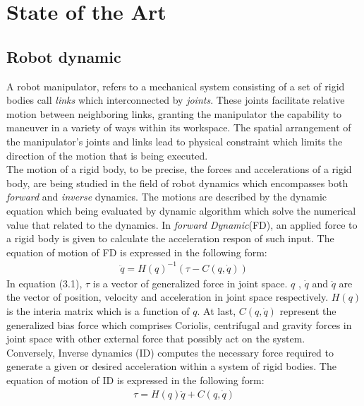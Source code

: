\documentclass[report.tex]{subfiles}
\begin{document}
    \chapter{State of the Art}
    \section{Robot dynamic}
    \noindent A robot manipulator, refers to a mechanical system consisting of a set of rigid bodies call \textit{links} which interconnected by \textit{joints}. These joints facilitate relative motion between neighboring links, granting the manipulator the capability to maneuver in a variety of ways within its workspace. The spatial arrangement of the manipulator's joints and links lead to physical constraint which limits the direction of the motion that is being executed.\\
    The motion of a rigid body, to be precise, the forces and accelerations of a rigid body, are being studied in the field of robot dynamics which encompasses both \textit{forward} and \textit{inverse} dynamics. The motions are described by the dynamic equation which being evaluated by dynamic algorithm which solve the numerical value that related to the dynamics\cite{featherstone2007book}.
    In \textit{forward Dynamic}(FD), an applied force to a rigid body is given to calculate the acceleration respon of such input\cite{featherstone2007book}. The equation of motion of FD is expressed in the following form:
    \begin{align}
            \ddot{q} = H(q)^{-1}(\tau - C(q,\dot{q}))
    \end{align}
    In equation (3.1), $\tau$ is a vector of generalized force in joint space. $q$ , $\dot{q}$ and $\ddot{q}$ are the vector of position, velocity and acceleration in joint space respectively. $H(q)$ is the interia matrix which is a function of $q$. At last, $C(q,\dot{q})$ represent the generalized bias force which comprises Coriolis, centrifugal and gravity forces in joint space with other external force that possibly act on the system\cite{featherstone2007book}.\\
    Conversely, Inverse dynamics (ID) computes the necessary force required to generate a given or desired acceleration within a system of rigid bodies. The equation of motion of ID is expressed in the following form\cite{featherstone2007book}:
    \begin{align}
        \tau  = H(q)\ddot{q}+ C(q,\dot{q})
    \end{align}
\end{document}
